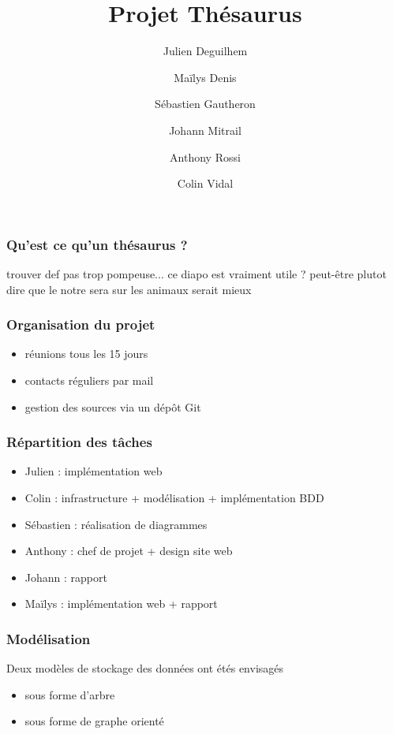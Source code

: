 \documentclass{beamer}
\author{Julien Deguilhem\and Maïlys Denis\and Sébastien Gautheron\and Johann Mitrail\and Anthony Rossi\and Colin Vidal}
\date{}
\begin{document}
 
\title{Projet Thésaurus}
\maketitle




\begin{frame}
\frametitle{Qu'est ce qu'un thésaurus ?}
trouver def pas trop pompeuse... ce diapo est vraiment utile ? peut-être plutot dire que le notre sera sur les animaux serait mieux 
\end{frame}



\begin{frame}
\frametitle{Organisation du projet}
\begin{itemize}
\item réunions tous les 15 jours
\item contacts réguliers par mail
\item gestion des sources via un dépôt Git
\end{itemize}
\end{frame}


\begin{frame}
\frametitle{Répartition des tâches}
\begin{itemize}
\item Julien : implémentation web
\item Colin : infrastructure + modélisation + implémentation BDD
\item Sébastien : réalisation de diagrammes
\item Anthony : chef de projet + design site web
\item Johann : rapport
\item Maïlys : implémentation web  + rapport
\end{itemize}
\end{frame}


\begin{frame}
\frametitle{Modélisation}
Deux modèles de stockage des données ont étés envisagés
\begin{itemize}
\item sous forme d'arbre
\item sous forme de graphe orienté
\end{itemize}
\end{frame}
\end{document}
